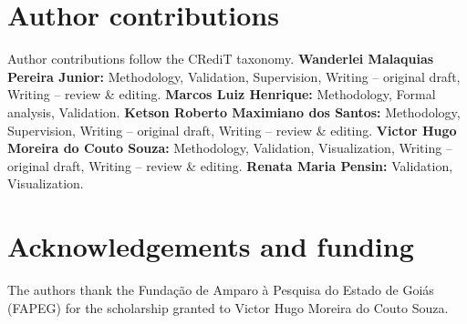 \documentclass[11pt,a4paper]{article}
\begin{document}
\setlength{\emergencystretch}{2em}










\section*{Author contributions}
Author contributions follow the CRediT taxonomy.
\textbf{Wanderlei Malaquias Pereira Junior:} Methodology, Validation,
Supervision, Writing -- original draft, Writing -- review \& editing.
\textbf{Marcos Luiz Henrique:} Methodology, Formal analysis, Validation.
\textbf{Ketson Roberto Maximiano dos Santos:} Methodology, Supervision,
Writing -- original draft, Writing -- review \& editing.
\textbf{Victor Hugo Moreira do Couto Souza:} Methodology, Validation,
Visualization, Writing -- original draft, Writing -- review \& editing.
\textbf{Renata Maria Pensin:} Validation, Visualization.

\section*{Acknowledgements and funding}
The authors thank the Funda\c{c}\~ao de Amparo \`a Pesquisa do Estado de
Goi\'as (FAPEG) for the scholarship granted to Victor Hugo Moreira do Couto
Souza.

\printbibliography
\end{document}
